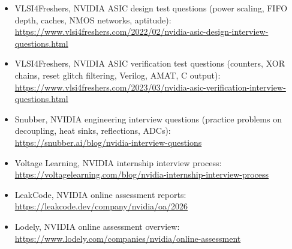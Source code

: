 \begin{itemize}
  \item VLSI4Freshers, NVIDIA ASIC design test questions (power scaling, FIFO depth, caches, NMOS networks, aptitude):\\ \url{https://www.vlsi4freshers.com/2022/02/nvidia-asic-design-interview-questions.html}
  \item VLSI4Freshers, NVIDIA ASIC verification test questions (counters, XOR chains, reset glitch filtering, Verilog, AMAT, C output):\\ \url{https://www.vlsi4freshers.com/2023/03/nvidia-asic-verification-interview-questions.html}
  \item Snubber, NVIDIA engineering interview questions (practice problems on decoupling, heat sinks, reflections, ADCs):\\ \url{https://snubber.ai/blog/nvidia-interview-questions}
  \item Voltage Learning, NVIDIA internship interview process:\\ \url{https://voltagelearning.com/blog/nvidia-internship-interview-process}
  \item LeakCode, NVIDIA online assessment reports:\\ \url{https://leakcode.dev/company/nvidia/oa/2026}
  \item Lodely, NVIDIA online assessment overview:\\ \url{https://www.lodely.com/companies/nvidia/online-assessment}
\end{itemize}

